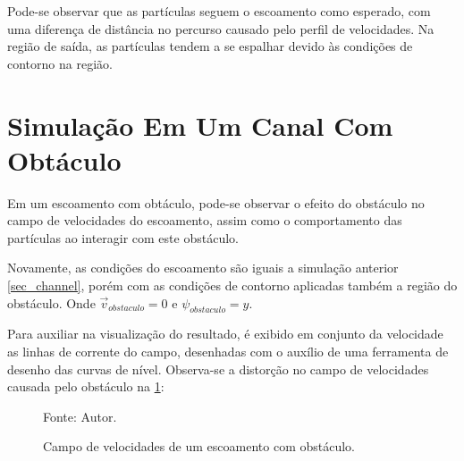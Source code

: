 Pode-se observar que as partículas seguem o escoamento como esperado, com uma diferença de distância no percurso causado pelo perfil de velocidades.
Na região de saída, as partículas tendem a se espalhar devido às condições de contorno na região.

\section{\textbf{Simulação Em Um Canal Com Obtáculo}}
\label{sec_obstacle}
Em um escoamento com obtáculo, pode-se observar o efeito do obstáculo no campo de velocidades do escoamento, assim como o comportamento das partículas ao interagir com este obstáculo.

Novamente, as condições do escoamento são iguais a simulação anterior \ref{sec_channel}, porém com as condições de contorno aplicadas também a região do obstáculo.
Onde $\vec{v}_{obstaculo}=0$ e $\psi_{obstaculo}=y$.

Para auxiliar na visualização do resultado, é exibido em conjunto da velocidade as linhas de corrente do campo, desenhadas com o auxílio de uma ferramenta de desenho das curvas de nível.
Observa-se a distorção no campo de velocidades causada pelo obstáculo na \ref{obstacle_result}:
\begin{figure}[H]
    \centering
     {\raggedleft \scriptsize Fonte: Autor.}
    \caption{Campo de velocidades de um escoamento com obstáculo.}
    \label{obstacle_result}
\end{figure}

